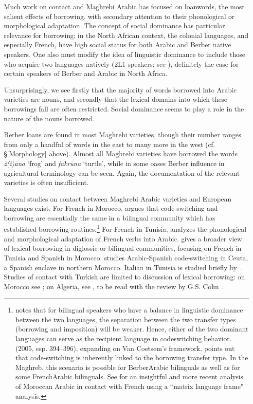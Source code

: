 \documentclass[output=paper]{langsci/langscibook}
\begin{document}
Much work on contact and Maghrebi Arabic has focused on loanwords, the most salient effects of borrowing, with secondary attention to their phonological or morphological adaptation. The concept of social dominance has particular relevance for borrowing: in the North African context, the colonial languages, and especially French, have high social status for both Arabic and Berber native speakers. One also must modify the idea of linguistic dominance to include those who acquire two languages natively (2L1 speakers; see \citealt[525]{Lucas2015}), definitely the case for certain speakers of Berber and Arabic in North Africa. 

  Unsurprisingly, we see firstly that the majority of words borrowed into Arabic varieties are nouns, and secondly that the lexical domains into which these borrowings fall are often restricted. Social dominance seems to play a role in the nature of the nouns borrowed.

  Berber loans are found in most Maghrebi varieties, though their number ranges from only a handful of words in the east to many more in the west (cf. §\ref{Morphology} above). Almost all Maghrebi varieties have borrowed the words \textit{ž(i){\R}āna} ‘frog’ and \textit{fakrūna} ‘turtle’, while in some oases Berber influence in agricultural terminology can be seen. Again, the documentation of the relevant varieties is often insufficient.

Several studies on contact between Maghrebi Arabic varieties and European languages exist. For French in Morocco, \citet{Heath1989} argues that code-switching and borrowing are essentially the same in a bilingual community which has established borrowing routines.\footnote{\citet[87]{VanCoetsem1988} notes that for bilingual speakers who have a balance in linguistic dominance between the two languages, the separation between the two transfer types (borrowing and imposition) will be weaker. Hence, either of the two dominant languages can serve as the recipient language in codeswitching behavior. \citeauthor{Winford2005} (2005, esp. 394–396), expanding on Van Coetsem’s framework, points out that code-switching is inherently linked to the borrowing transfer type. In the Maghreb, this scenario is possible for Berber\textendash Arabic bilinguals as well as for some French\textendash Arabic bilinguals. See \citet{Ziamari2008} for an insightful and more recent analysis of Moroccan Arabic in contact with French using a ``matrix language frame" analysis.} For French in Tunisia, \citet{Talmoudi1986} analyzes the phonological and morphological adaptation of French verbs into Arabic. \citet[127–151]{Sayahi2014} gives a broader view of lexical borrowing in diglossic or bilingual communities, focusing on French in Tunisia and Spanish in Morocco. \citet{Vicente2005} studies Arabic-Spanish code-switching in Ceuta, a Spanish enclave in northern Morocco. Italian in Tunisia is studied briefly by \citet{Cifoletti1994}. Studies of contact with Turkish are limited to discussion of lexical borrowing: on Morocco see \citet{Procházka2012}; on Algeria, see \citet{BenCheneb1922}, to be read with the review by G.S. Colin \citep[21–30]{Colin1999}.
\end{document}
